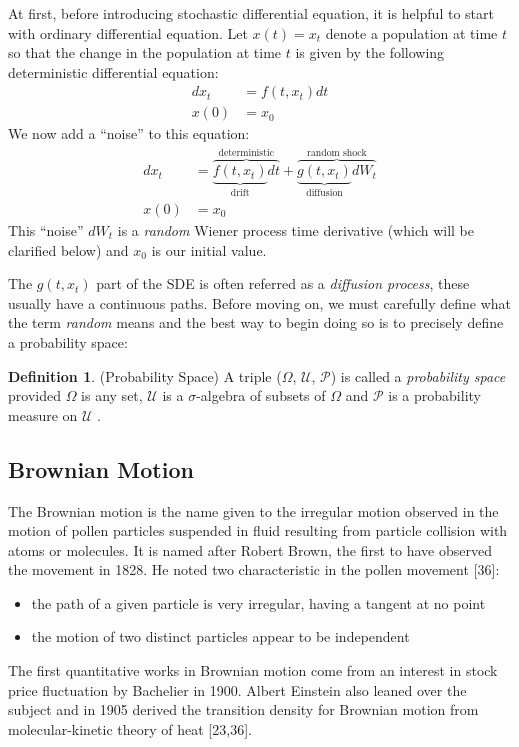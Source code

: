 \documentclass[12pt,twoside]{reedthesis}
\theoremstyle{definition}
\newtheorem{definition}{Definition}[section]
\theoremstyle{definition}
\theoremstyle{remark}
\begin{document}
  At first, before introducing stochastic differential equation, it is
  helpful to start with ordinary differential equation. Let \(x(t) = x_t\)
  denote a population at time \(t\) so that the change in the population
  at time \(t\) is given by the following deterministic differential
  equation:
  \begin{align}
  dx_t &= f(t, x_t)dt \\
  x(0) &= x_0 \nonumber
  \end{align}
  We now add a ``noise'' to this equation:
  \begin{align} \label{eq:sde1}
  dx_t &= \overbrace{\underbrace{f(t, x_t)}_\text{drift}dt}^\text{deterministic} + \overbrace{\underbrace{g(t, x_t)}_\text{diffusion}dW_t}^\text{random shock} \\
  x(0) &= x_0 \nonumber
  \end{align}
  This ``noise'' \(dW_t\) is a \emph{random} Wiener process time
  derivative (which will be clarified below) and \(x_0\) is our initial
  value.
  
  The \(g(t, x_t)\) part of the SDE is often referred as a \emph{diffusion
  process}, these usually have a continuous paths. Before moving on, we
  must carefully define what the term \emph{random} means and the best way
  to begin doing so is to precisely define a probability space:
  \begin{definition}{(Probability Space)} A triple ($\Omega$, $\mathcal {U}$, $\mathcal {P}$) is called a \textit{probability space} provided $\Omega$ is any set, $\mathcal {U}$ is a $\sigma$-algebra of subsets of $\Omega$ and $\mathcal {P}$ is a probability measure on $\mathcal {U}$ .
  \end{definition}
  \subsection{Brownian Motion}\label{brownian-motion}
  
  The Brownian motion is the name given to the irregular motion observed
  in the motion of pollen particles suspended in fluid resulting from
  particle collision with atoms or molecules. It is named after Robert
  Brown, the first to have observed the movement in 1828. He noted two
  characteristic in the pollen movement {[}36{]}:
  \begin{itemize}
  \item
    the path of a given particle is very irregular, having a tangent at no
    point
  \item
    the motion of two distinct particles appear to be independent
  \end{itemize}
  The first quantitative works in Brownian motion come from an interest in
  stock price fluctuation by Bachelier in 1900. Albert Einstein also
  leaned over the subject and in 1905 derived the transition density for
  Brownian motion from molecular-kinetic theory of heat {[}23,36{]}.
  
\end{document}
